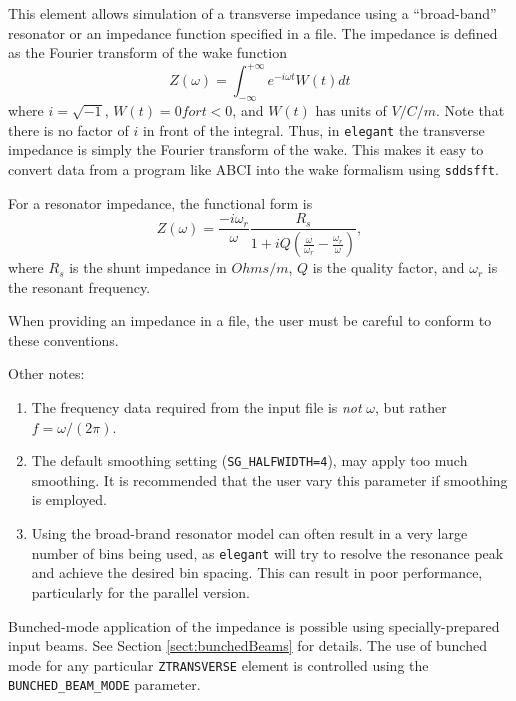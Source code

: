 This element allows simulation of a transverse impedance using a
``broad-band'' resonator or an impedance function specified in a file.
The impedance is defined as the Fourier transform of the wake function
\begin{equation}
Z(\omega) = \int_{-\infty}^{+\infty} e^{-i \omega t} W(t) dt
\end{equation}
where $i = \sqrt{-1}$, $W(t)=0 for t<0$, and $W(t)$ has units of
$V/C/m$.  Note that there is no factor of $i$ in front of the
integral.  Thus, in {\tt elegant} the transverse impedance is simply
the Fourier transform of the wake.  This makes it easy to convert data
from a program like ABCI into the wake formalism using {\tt sddsfft}.

For a resonator impedance, the functional form is
\begin{equation}
Z(\omega) = \frac{-i\omega_r}{\omega} \frac{R_s}{1 + iQ(\frac{\omega}{\omega_r} - \frac{\omega_r}{\omega})},
\end{equation}
where $R_s$ is the shunt impedance in $Ohms/m$, $Q$ is the quality
factor, and $\omega_r$ is the resonant frequency.

When providing an impedance in a file, the user must be careful to conform to these
conventions.

Other notes:
\begin{enumerate}
\item The frequency data required from the input file is {\em not} $\omega$, but rather
  $f = \omega/(2 \pi)$.
\item The default smoothing setting ({\tt SG\_HALFWIDTH=4}), may apply too much smoothing.
  It is recommended that the user vary this parameter if smoothing is employed.
\item Using the broad-brand resonator model can often result in a very large number of bins
 being used, as {\tt elegant} will try to resolve the resonance peak and achieve the desired
 bin spacing. This can result in poor performance, particularly for the parallel version.
\end{enumerate}

Bunched-mode application of the impedance is possible using specially-prepared input
beams. 
See Section \ref{sect:bunchedBeams} for details.
The use of bunched mode for any particular \verb|ZTRANSVERSE| element is controlled using the \verb|BUNCHED_BEAM_MODE| parameter.
